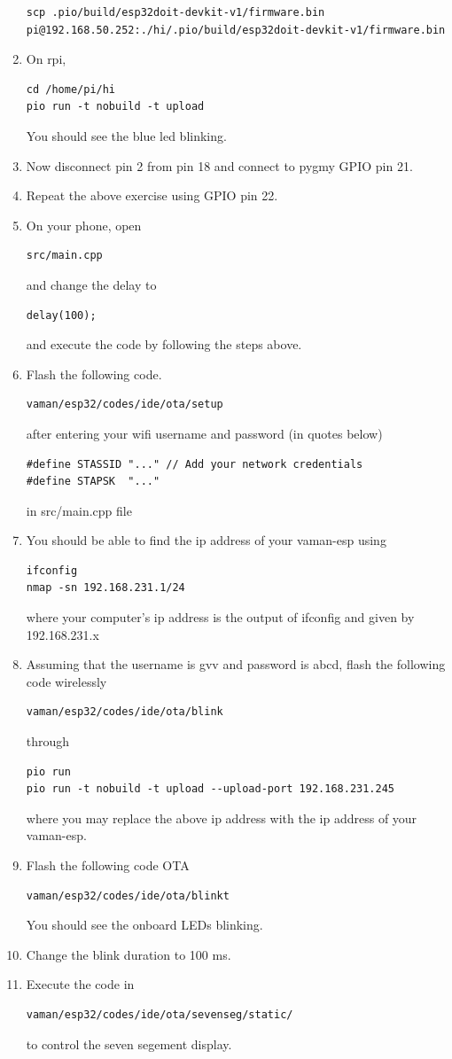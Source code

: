 \begin{enumerate}[label=\arabic*.,ref=\theenumi]
\begin{lstlisting}
scp .pio/build/esp32doit-devkit-v1/firmware.bin pi@192.168.50.252:./hi/.pio/build/esp32doit-devkit-v1/firmware.bin
\end{lstlisting}
\item On rpi,
\begin{lstlisting}
cd /home/pi/hi
pio run -t nobuild -t upload
\end{lstlisting}
You should see the blue led blinking.
\item Now disconnect pin 2 from pin 18 and connect to pygmy GPIO pin 21.  
\item Repeat the above exercise using 
	GPIO pin 22.
\item On your phone, open 
\begin{lstlisting}
src/main.cpp 
\end{lstlisting}
and change the delay to 
\begin{lstlisting}
delay(100);
\end{lstlisting}
and execute the code by following the steps above.
\item Flash the following code. 
\begin{lstlisting}
vaman/esp32/codes/ide/ota/setup
\end{lstlisting}
		after entering your wifi username and password (in quotes below)
\begin{lstlisting}
#define STASSID "..." // Add your network credentials
#define STAPSK  "..."
\end{lstlisting}
in src/main.cpp file
\item You should be able to find the ip address of your vaman-esp using 
\begin{lstlisting}
ifconfig
nmap -sn 192.168.231.1/24
\end{lstlisting}
where your computer's ip address is the output of ifconfig and given by 192.168.231.x
\item Assuming that the username is gvv and password is abcd, flash the following code wirelessly
\begin{lstlisting}
vaman/esp32/codes/ide/ota/blink
\end{lstlisting}
through 
\begin{lstlisting}
pio run 
pio run -t nobuild -t upload --upload-port 192.168.231.245
\end{lstlisting}
where you may replace the above ip address with the ip address of your vaman-esp.
\item Flash the following code OTA
\begin{lstlisting}
vaman/esp32/codes/ide/ota/blinkt
\end{lstlisting}
You should see the onboard LEDs blinking.
\item Change the blink duration to 100 ms.
\item Execute the code in 
\begin{lstlisting}
vaman/esp32/codes/ide/ota/sevenseg/static/
\end{lstlisting}
to control the seven segement display.
\end{enumerate}
